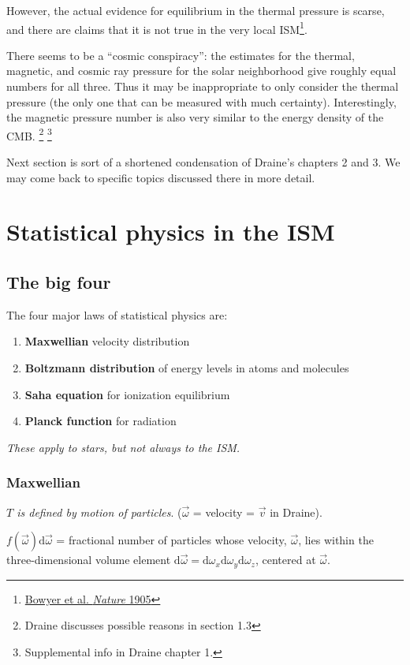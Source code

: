 \documentclass[11pt]{article}
\newcommand{\mar}[1]{\hspace{0pt}\marginpar{-\textcolor{black}{#1}-}}
\newcommand{\mynotes}[1]{{\fontfamily{cmss}\selectfont \textit{#1}}}
\let\oldsection\section
\renewcommand\section{\clearpage\oldsection}
\begin{document}
However, the actual evidence for equilibrium in the thermal pressure
is scarse, and there are claims that it is not true in the very local
ISM\footnote{\href{http://www.nature.com/nature/journal/v375/n6528/abs/375212a0.html}
{Bowyer et al. \textit{Nature} 1905}}.

There seems to be a ``cosmic conspiracy'': the estimates for the
thermal, magnetic, and cosmic ray pressure for the solar neighborhood
give roughly equal numbers for all three. Thus it may be inappropriate
to only consider the thermal pressure (the only one that can be
measured with much certainty). Interestingly, the magnetic pressure
number is also very similar to the energy density of the CMB\@.
\footnote{Draine discusses possible reasons in section 1.3}
\footnote{Supplemental info in Draine chapter 1.}

Next\mar{16} section is sort of a shortened condensation of Draine's chapters
2 and 3. We may come back to specific topics discussed there in more
detail.

\newpage
\section{Statistical physics in the ISM}
\subsection{The big four}
The four major laws of statistical physics are:
\begin{enumerate}
    \item \textbf{Maxwellian} velocity distribution
    \item \textbf{Boltzmann distribution} of energy levels in atoms and molecules
    \item \textbf{Saha equation} for ionization equilibrium
    \item \textbf{Planck function} for radiation
\end{enumerate}
\mynotes{These apply to stars, but not always to the ISM.}

\subsubsection{Maxwellian}
\mynotes{$T$ is defined by motion of particles}.
($\vec{\omega}$ = velocity = $\vec{v}$ in Draine).

$f(\vec{\omega})\mathrm{d}\vec{\omega}$ =
fractional number of particles whose velocity, $\vec{\omega}$, lies within the
three-dimensional volume element
$\mathrm{d}\vec{\omega} =
\mathrm{d}\omega_{x}\mathrm{d}\omega_{y}\mathrm{d}\omega_{z}$,
centered at $\vec{\omega}$.
\end{document}
